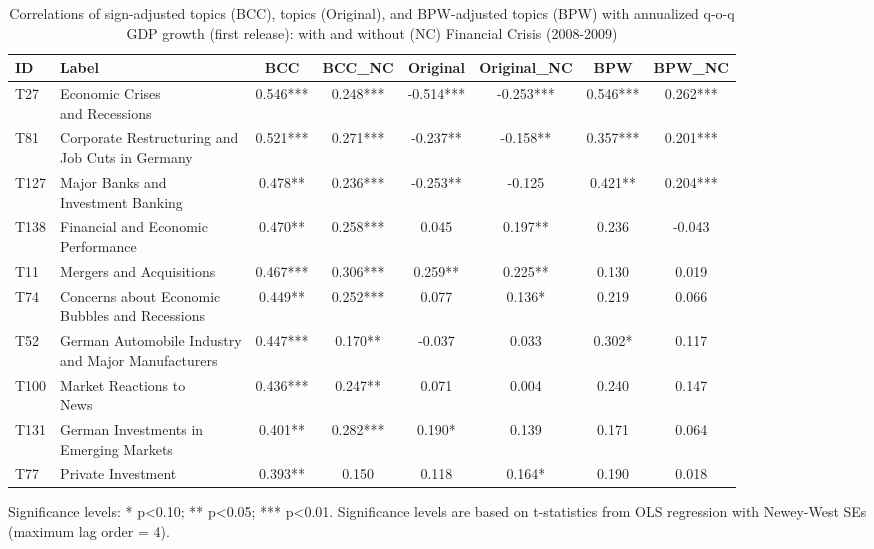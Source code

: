 \begin{table}[h!]
  \centering
  \label{tab:cor_gdp_different_approaches_crisis_sig}
  \begin{threeparttable}
    \scriptsize
    \renewcommand{\arraystretch}{1.3}
  \caption{Correlations of sign-adjusted topics (BCC), topics (Original), and BPW-adjusted topics (BPW) with annualized q-o-q GDP growth (first release): with and without (NC) Financial Crisis (2008-2009)}

\begin{tabular}{llcccccc}
\toprule
ID & Label & BCC & BCC\_NC & Original & Original\_NC & BPW & BPW\_NC\\
\midrule
T27 & \makecell[tl]{ Economic Crises \\ and Recessions} & 0.546*** & 0.248*** & -0.514*** & -0.253*** & 0.546*** & 0.262***\\
T81 & \makecell[tl]{ Corporate Restructuring and \\ Job Cuts in Germany} & 0.521*** & 0.271*** & -0.237** & -0.158** & 0.357*** & 0.201***\\
T127 & \makecell[tl]{ Major Banks and \\ Investment Banking} & 0.478** & 0.236*** & -0.253** & -0.125 & 0.421** & 0.204***\\
T138 & \makecell[tl]{ Financial and Economic \\ Performance} & 0.470** & 0.258*** & 0.045 & 0.197** & 0.236 & -0.043\\
T11 & Mergers and Acquisitions & 0.467*** & 0.306*** & 0.259** & 0.225** & 0.130 & 0.019\\
\addlinespace
T74 & \makecell[tl]{ Concerns about Economic\\ Bubbles and Recessions} & 0.449** & 0.252*** & 0.077 & 0.136* & 0.219 & 0.066\\
T52 & \makecell[tl]{ German Automobile Industry \\ and Major Manufacturers} & 0.447*** & 0.170** & -0.037 & 0.033 & 0.302* & 0.117\\
T100 & \makecell[tl]{ Market Reactions to \\News} & 0.436*** & 0.247** & 0.071 & 0.004 & 0.240 & 0.147\\
T131 & \makecell[tl]{German Investments in \\ Emerging Markets} & 0.401** & 0.282*** & 0.190* & 0.139 & 0.171 & 0.064\\
T77 & Private Investment & 0.393** & 0.150 & 0.118 & 0.164* & 0.190 & 0.018\\
\bottomrule
\end{tabular}

    \begin{tablenotes}[flushleft]
      \small
      \item Significance levels: * p<0.10; ** p<0.05; *** p<0.01. Significance levels are based on t-statistics from OLS regression with Newey-West SEs (maximum lag order = 4).
    \end{tablenotes}
  \end{threeparttable}
\end{table}

